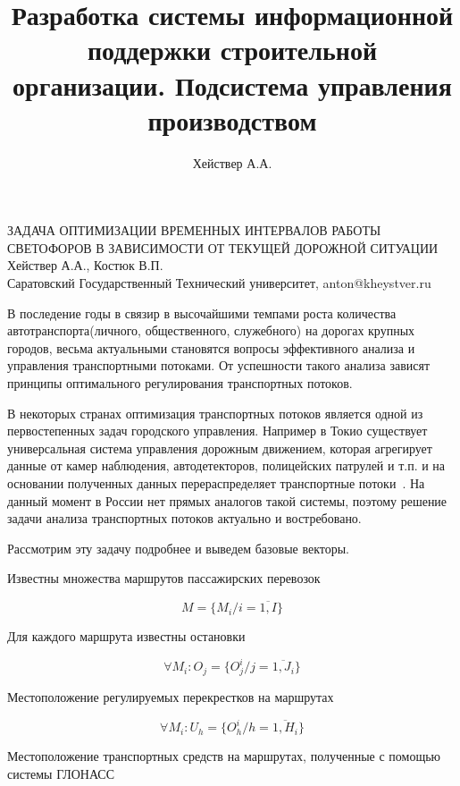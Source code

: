 \documentclass[a4paper,13pt]{article}
\title{Разработка системы информационной поддержки строительной организации. Подсистема управления производством}
\author{Хействер А.А.}
\date{}
\begin{document}
\begin{center} %
    \large ЗАДАЧА ОПТИМИЗАЦИИ ВРЕМЕННЫХ ИНТЕРВАЛОВ РАБОТЫ СВЕТОФОРОВ В ЗАВИСИМОСТИ ОТ ТЕКУЩЕЙ ДОРОЖНОЙ СИТУАЦИИ\\
    \large Хействер А.А., Костюк В.П.\\
    \large Саратовский Государственный Технический университет, anton@kheystver.ru
\end{center} %
\thispagestyle{empty} %
В последение годы в связир в высочайшими темпами роста количества автотранспорта(личного, общественного, служебного) на дорогах крупных городов, весьма актуальными становятся вопросы эффективного анализа и управления транспортными потоками. От успешности такого анализа зависят принципы оптимального регулирования транспортных потоков. 

В некоторых странах оптимизация транспортных потоков является одной из первостепенных задач городского управления. Например в Токио существует универсальная система управления дорожным движением, которая агрегирует данные от камер наблюдения, автодетекторов, полицейских патрулей и т.п. и на основании полученных данных перераспределяет транспортные потоки~\cite{pa}. На данный момент в России нет прямых аналогов такой системы, поэтому решение задачи анализа транспортных потоков актуально и востребовано.

Рассмотрим эту задачу подробнее и выведем базовые векторы.

Известны множества маршрутов пассажирских перевозок

\begin{equation}\label{eq:marshruts}
M = \{ M_i/i= \overline{1,I} \}
\end{equation}

Для каждого маршрута известны остановки

\begin{equation}\label{eq:stops}
\forall M_i :O_j = \{ O^i_{j}/j = \overline{1,J_i} \}
\end{equation}

Местоположение регулируемых перекрестков на маршрутах

\begin{equation}\label{eq:crosses}
\forall M_i :U_h = \{ O^i_{h}/h = \overline{1,H_i} \}
\end{equation}

Местоположение транспортных средств на маршрутах, полученные с помощью системы ГЛОНАСС
\end{document}
